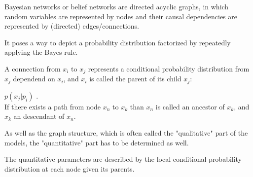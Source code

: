 Bayesian networks or belief networks are directed acyclic graphs, in which random variables are represented by nodes and their causal dependencies are represented by (directed) edges/connections. 

It poses a way to depict a probability distribution factorized by repeatedly applying the Bayes rule.

A connection from $x_i$ to $x_j$ represents a conditional probability distribution from $x_j$ dependend on $x_i$, and $x_i$ is called the parent of its child $x_j$:

$p(x_j | p_i)$ .
\\

If there exists a path from node $x_n$ to $x_k$ than $x_n$ is called an ancestor of $x_k$, and $x_k$ an descendant of $x_n$. 

As well as the graph structure, which is often called the "qualitative" part of the models, the "quantitative" part has to be determined as well.

The quantitative parameters are described by the local conditional probability distribution at each node given its parents.


